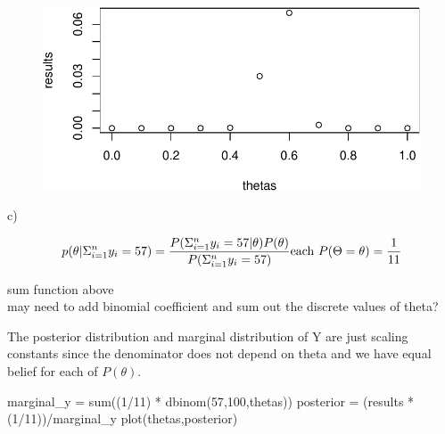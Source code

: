 \documentclass[
  letterpaper,
  DIV=11,
  numbers=noendperiod]{scrartcl}
\newenvironment{Shaded}{\begin{snugshade}}{\end{snugshade}}
\newcommand{\DecValTok}[1]{\textcolor[rgb]{0.68,0.00,0.00}{#1}}
\newcommand{\FunctionTok}[1]{\textcolor[rgb]{0.28,0.35,0.67}{#1}}
\newcommand{\NormalTok}[1]{\textcolor[rgb]{0.00,0.23,0.31}{#1}}
\newcommand{\OtherTok}[1]{\textcolor[rgb]{0.00,0.23,0.31}{#1}}
\newcommand{\SpecialCharTok}[1]{\textcolor[rgb]{0.37,0.37,0.37}{#1}}
\begin{document}
\begin{figure}[H]

{\centering \includegraphics{hw2_602_files/figure-pdf/unnamed-chunk-1-1.pdf}

}

\end{figure}

c)

\[
p(\theta | \Sigma_{i=1}^{n}y_i = 57) = \frac{P(\Sigma_{i=1}^{n}y_i = 57 | \theta)P(\theta)}{P(\Sigma_{i=1}^{n}y_i = 57)}  \\
\text{each } P(\Theta = \theta) = \frac{1}{11}\\
\\
\]

sum function above\\
may need to add binomial coefficient and sum out the discrete values of
theta?

The posterior distribution and marginal distribution of Y are just
scaling constants since the denominator does not depend on theta and we
have equal belief for each of \(P(\theta)\).

\begin{Shaded}
\begin{Highlighting}[]
\NormalTok{marginal\_y }\OtherTok{=} \FunctionTok{sum}\NormalTok{((}\DecValTok{1}\SpecialCharTok{/}\DecValTok{11}\NormalTok{) }\SpecialCharTok{*} \FunctionTok{dbinom}\NormalTok{(}\DecValTok{57}\NormalTok{,}\DecValTok{100}\NormalTok{,thetas))}
\NormalTok{posterior }\OtherTok{=}\NormalTok{ (results }\SpecialCharTok{*}\NormalTok{ (}\DecValTok{1}\SpecialCharTok{/}\DecValTok{11}\NormalTok{))}\SpecialCharTok{/}\NormalTok{marginal\_y}
\FunctionTok{plot}\NormalTok{(thetas,posterior)}
\end{Highlighting}
\end{Shaded}
\end{document}
